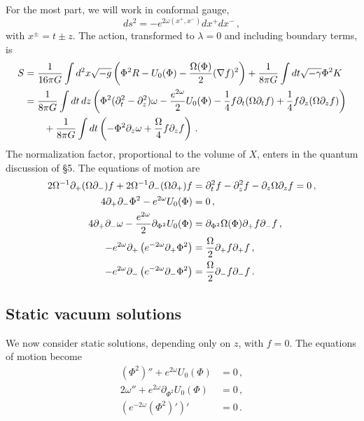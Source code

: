 \documentclass[12pt]{article}
\newcommand{\AAl}[1]{{\emph{\textcolor{blue}{#1}}}}
\newcommand{\OAAl}[1]{{\emph{\textcolor{blue}{\sout{#1}}}}}
\begin{document}
For the most part, we will work in conformal gauge, 
\begin{equation}
ds^2 = -e^{2 \omega(x^+,x^-)}dx^+ dx^- \,,\label{conformal}
\end{equation}
with $x^\pm = t \pm z$.
The action, transformed to $\lambda = 0$ and including boundary terms, is
\begin{align}
S &= {1 \over 16 \pi G} \int d^2x \sqrt{-g}\left( \Phi^2 R -  U_{0}(\Phi) - {\Omega(\Phi) \over 2 } (\nabla f)^2  \right)  + {1 \over 8 \pi G} \int dt \sqrt{-\gamma} \Phi^2  K \\
&= {1 \over 8 \pi G} \int dt\, dz \left( \Phi^2 (\partial_t^2 - \partial_z^2) \omega -  {e^{2 \omega} \over 2}U_{0}(\Phi)  - {1 \over 4} f \partial_t(\Omega  \partial_t f) + {1 \over 4} f \partial_z( \Omega  \partial_z f)   \right)  \nonumber \\
&\qquad
 + {1 \over 8 \pi G}  \int dt \left( - \Phi^2 \partial_z \omega + {\Omega \over 4} f \partial_z f \right) \,.
\label{fullact}
\end{align}
The normalization factor, proportional to the volume of $X$, enters in the quantum discussion of \S5.
The equations of motion are
\begin{align}
2 \Omega^{-1} \partial_+ (\Omega\partial_-) f +  2 \Omega^{-1} \partial_-(\Omega\partial_+) f &= \partial_t^2 f - \partial_z^2 f 
- \partial_z \Omega \partial_z f = 0 \,, \label{gef}\\
4 \partial_+ \partial_- \Phi^2 - e^{2 \omega } U_{0}(\Phi) &= 0 \,, \label{gephi}\\
4 \partial_+ \partial_- \omega   - {e^{2 \omega } \over 2} \partial_{\Phi^2} U_{0}(\Phi) &= \partial_{\Phi^2} \Omega(\Phi) \partial_+ f \partial_-f \,, \\
-e^{2 \omega } \partial_+ \left( e^{-2 \omega } \partial_+ \Phi^2 \right) &= {\Omega \over 2} \partial_+ f \partial_+ f \,, \label{gC1}\\
-e^{2 \omega } \partial_- \left( e^{-2 \omega } \partial_- \Phi^2 \right) &= {\Omega \over 2} \partial_- f \partial_- f \label{gC2} \,.
\end{align}


\subsection{Static vacuum solutions}

We now consider static solutions, depending only on $z$, with $f=0$.  The equations of motion become
\begin{align}
(\Phi^2)'' + e^{2 \omega } U_{0}(\Phi) &= 0 \,, \label{stat1}\\
2\omega''   + e^{2 \omega }  \partial_{\Phi^2} U_{0}(\Phi) &= 0\,,  \label{stat2} \\
 \left( e^{-2 \omega } (\Phi^2)' \right)' &= 0 \label{stat3} \,.
\end{align}
\end{document}
